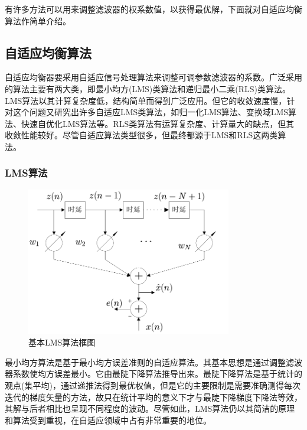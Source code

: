 有许多方法可以用来调整滤波器的权系数值，以获得最优解，下面就对自适应均衡算法作简单介绍。
\subsection{自适应均衡算法}
自适应均衡器要采用自适应信号处理算法来调整可调参数滤波器的系数。广泛采用的算法主要有两大类\citep{Simon2001}，即最小均方(LMS)类算法和递归最小二乘(RLS)类算法。LMS算法以其计算复杂度低，结构简单而得到广泛应用。但它的收敛速度慢，针对这个问题又研究出许多自适应LMS类算法，如归一化LMS算法、变换域LMS算法、快速自优化LMS算法等。RLS类算法有运算复杂度、计算量大的缺点，但其收敛性能较好。尽管自适应算法类型很多，但最终都源于LMS和RLS这两类算法。

\subsubsection*{LMS算法}
\begin{figure}[htb]
  \begin{center}
    \includegraphics[width=0.8\textwidth]{images/linearFilter.pdf}
  \end{center}
  \caption{基本LMS算法框图}
  \label{fig:2.2}
\end{figure}
最小均方算法是基于最小均方误差准则的自适应算法。其基本思想是通过调整滤波器系数使均方误差最小。它由最陡下降算法推导出来。最陡下降算法是基于统计的观点(集平均)，通过递推法得到最优权值，但是它的主要限制是需要准确测得每次迭代的梯度矢量的方法\citep{Simon2001}，故只在统计平均的意义下才与最陡下降梯度下降法等效，其解与后者相比也呈现不同程度的波动。尽管如此，LMS算法仍以其简洁的原理和算法受到重视，在自适应领域中占有非常重要的地位。

